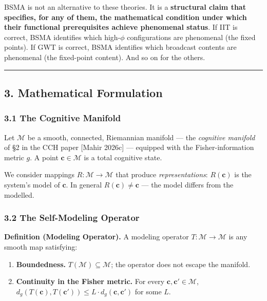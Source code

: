\documentclass[
  11pt,
  a4paper,
]{article}
\providecommand{\tightlist}{%
  \setlength{\itemsep}{0pt}\setlength{\parskip}{0pt}}
\begin{document}
BSMA is not an alternative to these theories. It is a \textbf{structural
claim that specifies, for any of them, the mathematical condition under
which their functional prerequisites achieve phenomenal status}. If IIT
is correct, BSMA identifies which high-\(\phi\) configurations are
phenomenal (the fixed points). If GWT is correct, BSMA identifies which
broadcast contents are phenomenal (the fixed-point content). And so on
for the others.

\begin{center}\rule{0.5\linewidth}{0.5pt}\end{center}

\subsection{3. Mathematical Formulation}\label{mathematical-formulation}

\subsubsection{3.1 The Cognitive Manifold}\label{the-cognitive-manifold}

Let \(\mathcal{M}\) be a smooth, connected, Riemannian manifold --- the
\emph{cognitive manifold} of §2 in the CCH paper {[}Mahir 2026c{]} ---
equipped with the Fisher-information metric \(g\). A point
\(\mathbf{c} \in \mathcal{M}\) is a total cognitive state.

We consider mappings \(R: \mathcal{M} \to \mathcal{M}\) that produce
\emph{representations}: \(R(\mathbf{c})\) is the system's model of
\(\mathbf{c}\). In general \(R(\mathbf{c}) \neq \mathbf{c}\) --- the
model differs from the modelled.

\subsubsection{3.2 The Self-Modeling
Operator}\label{the-self-modeling-operator}

\textbf{Definition (Modeling Operator).} A modeling operator
\(T: \mathcal{M} \to \mathcal{M}\) is any smooth map satisfying:

\begin{enumerate}
\def\labelenumi{\arabic{enumi}.}
\tightlist
\item
  \textbf{Boundedness.} \(T(\mathcal{M}) \subseteq \mathcal{M}\); the
  operator does not escape the manifold.
\item
  \textbf{Continuity in the Fisher metric.} For every
  \(\mathbf{c}, \mathbf{c}' \in \mathcal{M}\),
  \(d_g(T(\mathbf{c}), T(\mathbf{c}')) \leq L \cdot d_g(\mathbf{c}, \mathbf{c}')\)
  for some \(L\).
\end{enumerate}
\end{document}
